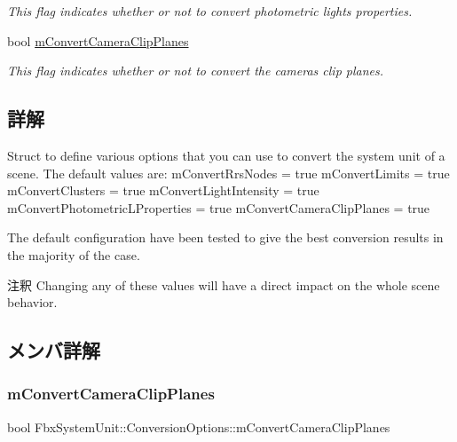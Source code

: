 \begin{DoxyCompactItemize}
\begin{DoxyCompactList}\small\item\em This flag indicates whether or not to convert photometric lights properties. \end{DoxyCompactList}\item 
bool \hyperlink{struct_fbx_system_unit_1_1_conversion_options_aed0a5ea01f2e171bfbd8d934f6556fe4}{m\+Convert\+Camera\+Clip\+Planes}
\begin{DoxyCompactList}\small\item\em This flag indicates whether or not to convert the cameras clip planes. \end{DoxyCompactList}\end{DoxyCompactItemize}


\subsection{詳解}
Struct to define various options that you can use to convert the system unit of a scene. The default values are\+: m\+Convert\+Rrs\+Nodes = true m\+Convert\+Limits = true m\+Convert\+Clusters = true m\+Convert\+Light\+Intensity = true m\+Convert\+Photometric\+L\+Properties = true m\+Convert\+Camera\+Clip\+Planes = true

The default configuration have been tested to give the best conversion results in the majority of the case. \begin{DoxyRemark}{注釈}
Changing any of these values will have a direct impact on the whole scene behavior. 
\end{DoxyRemark}


\subsection{メンバ詳解}
\mbox{\label{struct_fbx_system_unit_1_1_conversion_options_aed0a5ea01f2e171bfbd8d934f6556fe4}} 
\subsubsection{\texorpdfstring{m\+Convert\+Camera\+Clip\+Planes}{mConvertCameraClipPlanes}}
{\footnotesize\ttfamily bool Fbx\+System\+Unit\+::\+Conversion\+Options\+::m\+Convert\+Camera\+Clip\+Planes}



